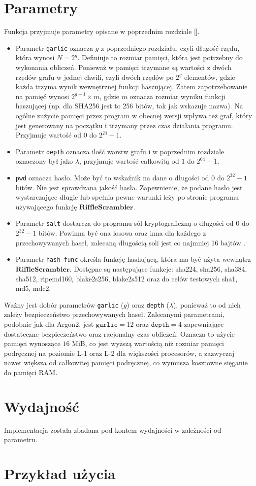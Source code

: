 \section{Parametry}
Funkcja przyjmuje parametry opisane w poprzednim rozdziale [].
\begin{itemize}
	\item Parametr \texttt{garlic} oznacza $g$ z poprzedniego rozdziału, czyli długość rzędu, która wynosi $N = 2^{g}$.
	Definiuje to rozmiar pamięci, która jest potrzebny do wykonania obliczeń.
	Ponieważ w pamięci trzymane są wartości z dwóch rzędów grafu w jednej chwili, czyli dwóch rzędów po $2^g$ elementów, gdzie każda trzyma wynik wewnętrznej funkcji haszującej. Zatem zapotrzebowanie na pamięć wynosi $2^{g + 1} \times m$, gdzie $m$ oznacza rozmiar wyniku funkcji haszującej (np. dla SHA256 jest to 256 bitów, tak jak wskazuje nazwa).
	Na ogólne zużycie pamięci przez program w obecnej wersji wpływa też graf, który jest generowany na początku i trzymany przez czas działania programu. Przyjmuje wartość od $0$ do $2^{24} - 1$.
	
	\item Parametr \texttt{depth} oznacza ilość warstw grafu i w poprzednim rozdziale oznaczony był jako $\lambda$, przyjmuje wartość całkowitą od $1$ do $2^{64} - 1$.
	
	\item \texttt{pwd} oznacza hasło. Może być to wskaźnik na dane o długości od $0$ do $2^{32} -1$ bitów. Nie jest sprawdzana jakość hasła.
	Zapewnienie, że podane hasło jest wystarczające długie lub spełnia pewne warunki leży po stronie programu używającego funkcję $\mathbf{RiffleScrambler}$.
	\item Parametr \texttt{salt} dostarcza do programu sól kryptograficzną o długości od $0$ do $2^{32} - 1$ bitów. Powinna być ona losowa oraz inna dla każdego z przechowywanych haseł, zalecaną długością soli jest co najmniej 16 bajtów \cite{PHC2013}.
	
	\item Parametr \texttt{hash\_func} określa funkcję hashującą, która ma być użyta wewnątrz $\mathbf{RiffleScrambler}$. Dostępne są następujące funkcje: sha224, sha256, sha384, sha512, ripemd160, blake2s256, blake2s512 oraz do celów testowych sha1, md5, mdc2.
\end{itemize}

Ważny jest dobór parametrów \texttt{garlic} ($g$) oraz \texttt{depth} ($\lambda$), ponieważ to od nich zależy bezpieczeństwo przechowywanych haseł. Zalecanymi parametrami, podobnie jak dla Argon2, jest $\texttt{garlic}=12$ oraz $\texttt{depth}=4$ zapewniające dostateczne bezpieczeństwo oraz racjonalny czas obliczeń. Oznacza to użycie pamięci wynoszące $16$ MiB, co jest wyższą wartością niż rozmiar pamięci podręcznej na poziomie L-1 oraz L-2 dla większości procesorów, a zazwyczaj nawet większa od całkowitej pamięci podręcznej, co wymusza kosztowne sięganie do pamięci RAM. 

\section{Wydajność}
Implementacja została zbadana pod kontem wydajności w zależności od parametru.

\section{Przykład użycia}


